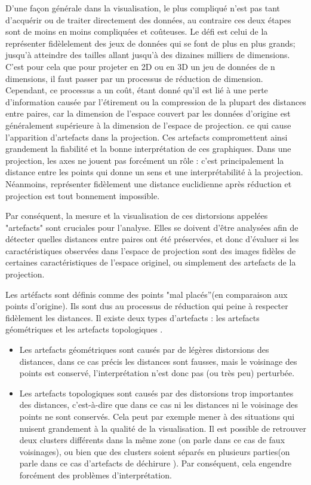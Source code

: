 D’une façon générale dans la visualisation, le plus compliqué n’est pas tant d’acquérir ou de traiter directement des données, au contraire ces deux étapes sont de moins en moins compliquées et coûteuses. Le défi est celui de la représenter fidèlelement des jeux de données qui se font de plus en plus grands; jusqu’à atteindre des tailles allant jusqu’à des dizaines milliers de dimensions.
C'est pour cela que pour projeter en 2D ou en 3D  un jeu de données de n dimensions, il faut passer par un processus de réduction de dimension.
 Cependant, ce processus a un coût, étant donné qu'il est lié à une perte d'information causée par l'étirement ou la compression de la plupart des distances entre paires, 
 car la dimension de l'espace couvert par les données d'origine est généralement supérieure à la dimension de l'espace de projection.  ce qui cause l’apparition d’artefacts dans la projection. Ces artefacts compromettent ainsi grandement la fiabilité et la bonne interprétation de ces graphiques\cite{scarlet}. 
Dans une projection, les axes ne jouent pas forcément un rôle : c’est principalement la distance entre les points qui donne un sens et une interprétabilité à la projection\cite{koffka1997PsychoGesttalt}. 
Néanmoins, représenter fidèlement une distance euclidienne après réduction et projection est tout bonnement impossible. 

Par conséquent, la mesure et la visualisation de ces distorsions appelées "artefacts" sont cruciales pour l'analyse. Elles se doivent d'être analysées afin de détecter quelles distances entre paires ont été préservées, 
et donc d'évaluer si les caractéristiques observées dans l'espace de projection sont des images fidèles de certaines caractéristiques de l'espace originel, ou simplement des artefacts de la projection.
\medskip

Les artéfacts sont définis comme des points "mal placés”(en comparaison aux points d’origine). Ils sont dus au processus de réduction qui peine à respecter fidèlement les distances. Il existe deux types d’artefacts : les artefacts géométriques et les artefacts topologiques \cite{HeulotAnEvaluation}.
\begin{itemize}
    \item Les artefacts géométriques sont causés par de légères distorsions des distances, dans ce cas précis les distances sont fausses, mais le voisinage des points est conservé,  l’interprétation n’est donc pas (ou très peu) perturbée.
    \item Les artefacts topologiques sont causés par des distorsions trop importantes des distances, c'est-à-dire que dans ce cas ni les distances ni le voisinage des points ne sont conservés. Cela peut par exemple mener à des situations qui nuisent grandement à la qualité de la visualisation. Il est possible de retrouver deux clusters différents dans la même zone (on parle dans ce cas de faux voisinages), ou bien que des clusters soient séparés en plusieurs parties(on parle dans ce cas d’artefacts de déchirure \cite{HeulotThese}). Par conséquent, cela engendre forcément des problèmes d’interprétation.
\end{itemize}

